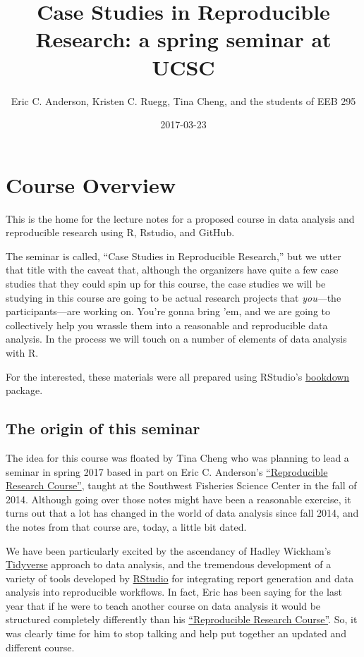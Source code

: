 \documentclass[]{book}
\title{Case Studies in Reproducible Research: a spring seminar at UCSC}
\author{Eric C. Anderson, Kristen C. Ruegg, Tina Cheng, and the students of EEB
295}
\date{2017-03-23}
\theoremstyle{definition}
\theoremstyle{definition}
\theoremstyle{remark}
\begin{document}
\maketitle

{
\setcounter{tocdepth}{1}
\tableofcontents
}
\chapter{Course Overview}\label{course-overview}

This is the home for the lecture notes for a proposed course in data
analysis and reproducible research using R, Rstudio, and GitHub.

The seminar is called, ``Case Studies in Reproducible Research,'' but we
utter that title with the caveat that, although the organizers have
quite a few case studies that they could spin up for this course, the
case studies we will be studying in this course are going to be actual
research projects that \emph{you}---the participants---are working on.
You're gonna bring 'em, and we are going to collectively help you
wrassle them into a reasonable and reproducible data analysis. In the
process we will touch on a number of elements of data analysis with R.

For the interested, these materials were all prepared using RStudio's
\href{https://bookdown.org/}{bookdown} package.

\section{The origin of this seminar}\label{the-origin-of-this-seminar}

The idea for this course was floated by Tina Cheng who was planning to
lead a seminar in spring 2017 based in part on Eric C. Anderson's
\href{http://eriqande.github.io/rep-res-web/}{``Reproducible Research
Course''}, taught at the Southwest Fisheries Science Center in the fall
of 2014. Although going over those notes might have been a reasonable
exercise, it turns out that a lot has changed in the world of data
analysis since fall 2014, and the notes from that course are, today, a
little bit dated.

We have been particularly excited by the ascendancy of Hadley Wickham's
\href{http://tidyverse.org/}{Tidyverse} approach to data analysis, and
the tremendous development of a variety of tools developed by
\href{https://www.rstudio.com/}{RStudio} for integrating report
generation and data analysis into reproducible workflows. In fact, Eric
has been saying for the last year that if he were to teach another
course on data analysis it would be structured completely differently
than his \href{http://eriqande.github.io/rep-res-web/}{``Reproducible
Research Course''}. So, it was clearly time for him to stop talking and
help put together an updated and different course.
\end{document}
